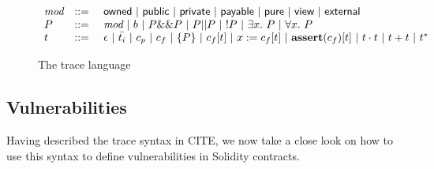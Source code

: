 \begin{figure}[t]
$
\begin{array}{lcl}
\textit{mod}&::=~&\textsf{owned}~|~ \textsf{public}~|~\textsf{private}~|~\textsf{payable}~|~\textsf{pure}~|~\textsf{view}~|~\textsf{external}\\
P&::=~&\textit{mod}~|~ b ~|~ P \&\& P ~|~ P || P ~|~ !P~|~\exists x.~P~|~ \forall x.~P\\
t&::=~&\epsilon~|~\bar{t_i}~|~c_{p}~|~c_f~|~\{P\}~|~c_f[t]~|~x:=c_f[t]~|~\textbf{assert}(c_f)[t]~|~t \cdot t~|~t+t~|~t^*
\end{array}
$
\caption{The trace language}\label{fig:assert}
\end{figure}

\subsection{Vulnerabilities}

Having described the trace syntax in CITE, we now take a close look on how to use this syntax to define vulnerabilities in Solidity contracts.


